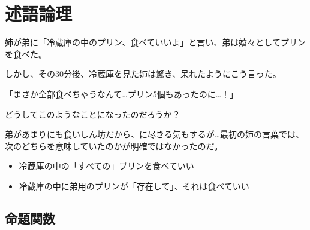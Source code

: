 \documentclass[../../imaging-math]{subfiles}
\begin{document}
\section{述語論理}

姉が弟に「冷蔵庫の中のプリン、食べていいよ」と言い、弟は嬉々としてプリンを食べた。

しかし、その30分後、冷蔵庫を見た姉は驚き、呆れたようにこう言った。

「まさか全部食べちゃうなんて…プリン5個もあったのに…！」

\br

どうしてこのようなことになったのだろうか？

弟があまりにも食いしん坊だから、に尽きる気もするが…最初の姉の言葉では、次のどちらを意味していたのかが明確ではなかったのだ。

\begin{itemize}
  \item 冷蔵庫の中の「すべての」プリンを食べていい
  \item 冷蔵庫の中に弟用のプリンが「存在して」、それは食べていい
\end{itemize}

\subsection{命題関数}
\end{document}
